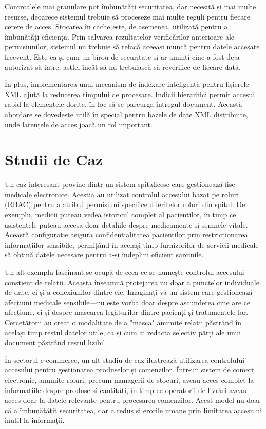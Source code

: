 \documentclass[runningheads]{llncs}
\begin{document}
\begin{spacing}{1.5}
Controalele mai granulare pot îmbunătăți securitatea, dar necesită și mai multe resurse, deoarece sistemul trebuie să proceseze mai multe reguli pentru fiecare cerere de acces. Stocarea în cache este, de asemenea, utilizată pentru a îmbunătăți eficiența. Prin salvarea rezultatelor verificărilor anterioare ale permisiunilor, sistemul nu trebuie să refacă aceeași muncă pentru datele accesate frecvent. Este ca și cum un birou de securitate și-ar aminti cine a fost deja autorizat să intre, astfel încât să nu trebuiască să reverifice de fiecare dată.

În plus, implementarea unui mecanism de indexare inteligentă pentru fișierele XML ajută la reducerea timpului de procesare. Indicii hierarhici permit accesul rapid la elementele dorite, în loc să se parcurgă întregul document. Această abordare se dovedește utilă în special pentru bazele de date XML distribuite, unde latențele de acces joacă un rol important.

\section{Studii de Caz}
Un caz interesant provine dintr-un sistem spitalicesc care gestionează fișe medicale electronice. Aceștia au utilizat controlul accesului bazat pe roluri (RBAC) pentru a atribui permisiuni specifice diferitelor roluri din spital. De exemplu, medicii puteau vedea istoricul complet al pacienților, în timp ce asistentele puteau accesa doar detaliile despre medicamente și semnele vitale. Această configurație asigura confidențialitatea pacienților prin restricționarea informațiilor sensibile, permițând în același timp furnizorilor de servicii medicale să obțină datele necesare pentru a-și îndeplini eficient sarcinile.

Un alt exemplu fascinant se ocupă de ceea ce se numește controlul accesului conștient de relații. Aceasta înseamnă protejarea nu doar a punctelor individuale de date, ci și a conexiunilor dintre ele. Imaginați-vă un sistem care gestionează afecțiuni medicale sensibile—nu este vorba doar despre ascunderea cine are ce afecțiune, ci și despre mascarea legăturilor dintre pacienți și tratamentele lor. Cercetătorii au creat o modalitate de a "masca" anumite relații păstrând în același timp restul datelor utile, ca și cum ai redacta selectiv părți ale unui document păstrând restul lizibil.

În sectorul e-commerce, un alt studiu de caz ilustrează utilizarea controlului accesului pentru gestionarea produselor și comenzilor. Într-un sistem de comerț electronic, anumite roluri, precum managerii de stocuri, aveau acces complet la informațiile despre produse și cantități, în timp ce operatorii de livrări aveau acces doar la datele relevante pentru procesarea comenzilor. Acest model nu doar că a îmbunătățit securitatea, dar a redus și erorile umane prin limitarea accesului inutil la informații.


\end{spacing}
\end{document}
